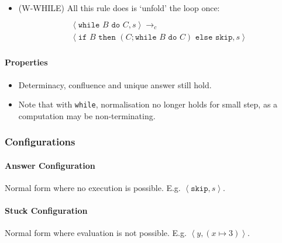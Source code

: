 \documentclass[twocolumn,english]{article}
\begin{document}
\begin{itemize}
\item {\scriptsize{}{}{}(W-WHILE)} All this rule does is `unfold' the
loop once: 
\begin{multline*}
\begin{array}{c}
\\
\hline \left\langle \texttt{while }B\texttt{ do }C,s\right\rangle \rightarrow_{c}\\
\left\langle \texttt{if }B\texttt{ then }(C;\texttt{while }B\texttt{ do }C)\texttt{ else skip},s\right\rangle 
\end{array}
\end{multline*}

\end{itemize}

\paragraph{Properties}
\begin{itemize}
\item Determinacy, confluence and unique answer still hold. 
\item Note that with \texttt{while}, normalisation no longer holds for small
step, as a computation may be non-terminating. 
\end{itemize}

\subsubsection{Configurations}


\paragraph{Answer Configuration}

Normal form where no execution is possible. E.g. $\left\langle \texttt{skip},s\right\rangle $.


\paragraph{Stuck Configuration}

Normal form where evaluation is not possible. E.g. $\left\langle y,(x\mapsto3)\right\rangle $.
\end{document}
